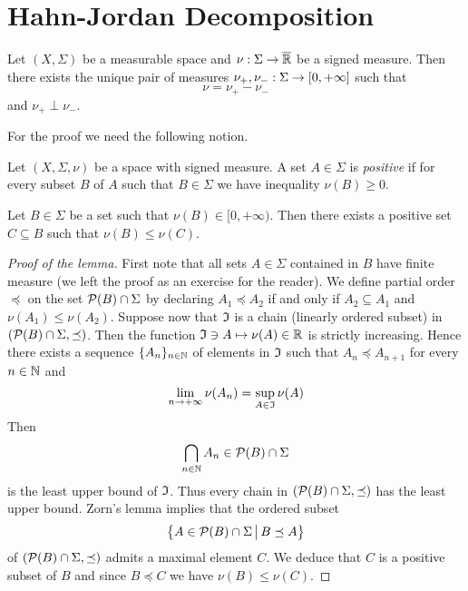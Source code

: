 \section{Hahn-Jordan Decomposition}

\begin{theorem}\label{theorem:jordansdecomposition}
Let $\left(X,\Sigma\right)$ be a measurable space and $\nu:\Sigma\rightarrow \overline{{\mathbb R}}$ be a signed measure. Then there exists the unique pair of measures $\nu_+,\nu_-:\Sigma \rightarrow [0,+\infty]$ such that  
$$\nu = \nu_+ - \nu_-$$
and $\nu_+ \perp \nu_-$.
\end{theorem}
\noindent
For the proof we need the following notion.

\begin{definition}
Let $(X,\Sigma,\nu)$ be a space with signed measure. A set $A\in \Sigma$ is \textit{positive} if for every subset $B$ of $A$ such that $B\in \Sigma$ we have inequality $\nu(B)\geq 0$. 
\end{definition}

\begin{lemma}\label{lemma:positiveexist}
Let $B\in \Sigma$ be a set such that $\nu(B)\in [0,+\infty)$. Then there exists a positive set $C\subseteq B$ such that $\nu(B)\leq \nu(C)$.
\end{lemma}
\begin{proof}[Proof of the lemma]
First note that all sets $A\in \Sigma$ contained in $B$ have finite measure (we left the proof as an exercise for the reader). We define partial order $\preceq$ on the set ${\mathcal P}(B)\cap \Sigma$ by declaring $A_1 \preceq A_2$ if and only if $A_2\subseteq A_1$ and $\nu(A_1)\leq \nu(A_2)$. Suppose now that $\mathfrak{I}$ is a chain (linearly ordered subset) in $\left({\mathcal P}(B)\cap \Sigma,\preceq \right)$. Then the function $\mathfrak{I}\ni A\mapsto \nu(A)\in {\mathbb R}$ is strictly increasing. Hence there exists a sequence $\{A_n\}_{n\in {\mathbb N}}$ of elements in $\mathfrak{I}$ such that $A_n\preceq A_{n+1}$ for every $n\in {\mathbb N}$ and 
$$\lim_{n\rightarrow +\infty}\nu(A_n)= \sup_{A\in \mathfrak{I}}\nu(A)$$
Then 
$$\bigcap_{n\in {\mathbb N}}A_n\in {\mathcal P}(B)\cap \Sigma$$
is the least upper bound of $\mathfrak{I}$. Thus every chain in $\left({\mathcal P}(B)\cap \Sigma,\preceq\right)$ has the least upper bound. Zorn's lemma implies that the ordered subset
$$\big\{A\in {\mathcal P}(B)\cap \Sigma\,\big|\,B\preceq A\big\}$$
of $\left({\mathcal P}(B)\cap \Sigma,\preceq \right)$ admits a maximal element $C$. We deduce that $C$ is a positive subset of $B$ and since $B\preceq C$ we have $\nu(B)\leq \nu(C)$.
\end{proof}

